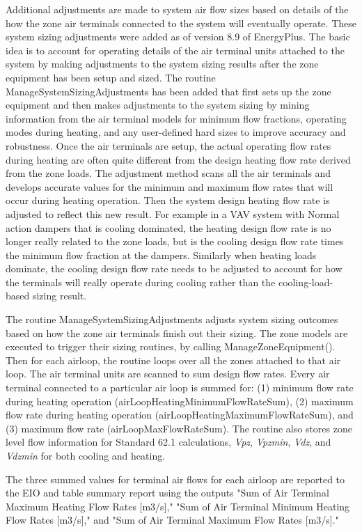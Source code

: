 Additional adjustments are made to system air flow sizes based on details of the how the zone air terminals connected to the system will eventually operate.  These system sizing adjustments were added as of version 8.9 of EnergyPlus.  The basic idea is to account for operating details of the air terminal units attached to the system by making adjustments to the system sizing results after the zone equipment has been setup and sized.  The routine ManageSystemSizingAdjustments has been added that first sets up the zone equipment and then makes adjustments to the system sizing by mining information from the air terminal models for minimum flow fractions, operating modes during heating, and any user-defined hard sizes to improve accuracy and robustness.  Once the air terminals are setup, the actual operating flow rates during heating are often quite different from the design heating flow rate derived from the zone loads.  The adjustment method scans all the air terminals and develops accurate values for the minimum and maximum flow rates that will occur during heating operation.  Then the system design heating flow rate is adjusted to reflect this new result.  For example in a VAV system with Normal action dampers that is cooling dominated, the heating design flow rate is no longer really related to the zone loads, but is the cooling design flow rate times the minimum flow fraction at the dampers. Similarly when heating loads dominate, the cooling design flow rate needs to be adjusted to account for how the terminals will really operate during cooling rather than the cooling-load-based sizing result.

The routine ManageSystemSizingAdjustments adjusts system sizing outcomes based on how the zone air terminals finish out their sizing. The zone models are executed to trigger their sizing routines, by calling ManageZoneEquipment(). Then for each airloop, the routine loops over all the zones attached to that air loop. The air terminal units are scanned to sum design flow rates. Every air terminal connected to a particular air loop is summed for: (1) minimum flow rate during heating operation (airLoopHeatingMinimumFlowRateSum), (2) maximum flow rate during heating operation (airLoopHeatingMaximumFlowRateSum), and (3) maximum flow rate (airLoopMaxFlowRateSum). The routine also stores zone level flow information for Standard 62.1 calculations, \emph{Vpz}, \emph{Vpzmin}, \emph{Vdz}, and \emph{Vdzmin} for both cooling and heating.

The three summed values for terminal air flows for each airloop are reported to the EIO and table summary report using the outputs "Sum of Air Terminal Maximum Heating Flow Rates [m3/s]," "Sum of Air Terminal Minimum Heating Flow Rates [m3/s]," and "Sum of Air Terminal Maximum Flow Rates [m3/s]."

